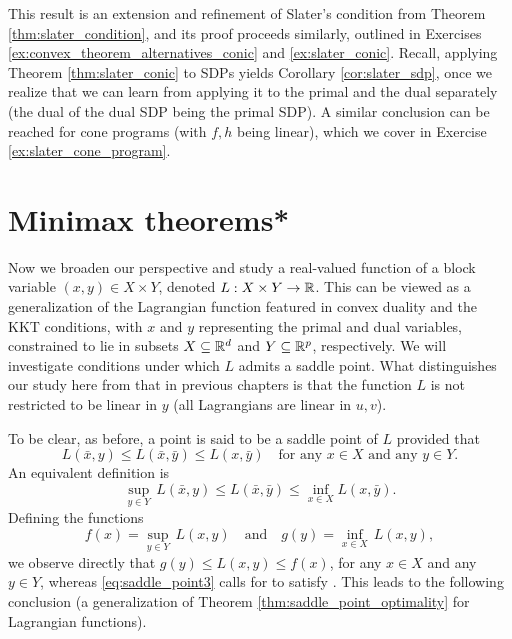 This result is an extension and refinement of Slater's condition from Theorem 
\ref{thm:slater_condition}, and its proof proceeds similarly, outlined in
Exercises \ref{ex:convex_theorem_alternatives_conic} and \ref{ex:slater_conic}.  
Recall, applying Theorem \ref{thm:slater_conic} to SDPs yields Corollary 
\ref{cor:slater_sdp}, once we realize that we can learn from applying it to the
primal and the dual separately (the dual of the dual SDP being the primal SDP). 
A similar conclusion can be reached for cone programs (with $f,h$ being linear),
which we cover in Exercise \ref{ex:slater_cone_program}.

\section{Minimax theorems*}
\label{sec:minimax_theorems}

Now we broaden our perspective and study a real-valued function of a block
variable $(x,y) \in X \times Y$, denoted $L : X \times Y \to \mathbb{R}$. This can be
viewed as a generalization of the Lagrangian function featured in convex duality 
and the KKT conditions, with $x$ and $y$ representing the primal and dual
variables, constrained to lie in subsets $X \subseteq \mathbb{R}^d$ and $Y \subseteq  
\mathbb{R}^p$, respectively. We will investigate conditions under which $L$ admits a 
saddle point. What distinguishes our study here from that in previous chapters
is that the function $L$ is not restricted to be linear in $y$ (all Lagrangians
are linear in $u,v$).        

To be clear, as before, a point  is
said to be a saddle point of $L$ provided that  
\begin{equation}
\label{eq:saddle_point2}
L(\bar{x}, y) \leq L(\bar{x}, \bar{y}) \leq L(x, \bar{y}) \quad \text{for any
  $x \in X$ and any $y \in Y$}. 
\end{equation}
An equivalent definition is 
\begin{equation}
\label{eq:saddle_point3}
\sup_{y \in Y} \, L(\bar{x}, y) \leq L(\bar{x}, \bar{y}) \leq \inf_{x \in X}
L(x, \bar{y}). 
\end{equation}
Defining the functions
\begin{equation}
\label{eq:saddle_functions}
f(x) = \sup_{y \in Y} \, L(x,y) \quad \text{and} \quad 
g(y) = \inf_{x \in X} \, L(x,y),
\end{equation}
we observe directly that $g(y) \leq L(x,y) \leq f(x)$, for any $x \in X$ and any 
$y \in Y$, whereas \eqref{eq:saddle_point3} calls for  to satisfy . This leads to the following conclusion (a generalization of
Theorem \ref{thm:saddle_point_optimality} for Lagrangian functions). 

